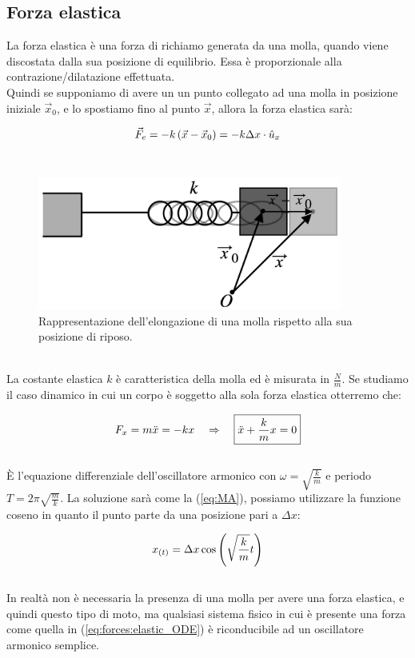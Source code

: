 \subsection{Forza elastica}
La forza elastica è una forza di richiamo generata da una molla, quando viene
discostata dalla sua posizione di equilibrio. Essa è proporzionale alla
contrazione/dilatazione effettuata.\\ Quindi se supponiamo di avere un un
punto collegato ad una molla in posizione iniziale $\vec x_0$, e lo spostiamo
fino al punto $\vec x$, allora la forza elastica sarà:

\begin{equation}
    \vec F_e = -k\left(\vec x-\vec x_0\right) = -k\Delta x\cdot\hat u_x
\end{equation}
\\
\begin{figure}[htbp]
    \begin{center}
        \includegraphics[width=10cm]{images/molla.png}
        \caption{Rappresentazione dell'elongazione di una molla rispetto
        alla sua posizione di riposo.}
\end{center}
\label{fig:forces:elastic}
\end{figure}
\\
La costante elastica $k$ è caratteristica della molla ed è misurata in
$\frac Nm$. Se studiamo il caso dinamico in cui un corpo è soggetto alla
sola forza elastica otterremo che:

\begin{equation}
    F_x = m\ddot x = -kx \quad\Rightarrow\quad \boxed{\ddot x +\frac km x = 0}
\label{eq:forces:elastic_ODE}
\end{equation}
\\
È l'equazione differenziale dell'oscillatore armonico con
$\omega = \sqrt{\frac km}$ e periodo $T =2\pi\sqrt{\frac mk}$.
La soluzione sarà come la (\ref{eq:MA}), possiamo utilizzare la funzione
coseno in quanto il punto parte da una posizione pari a $\Delta x$:

\begin{equation}
    x_{(t)} = \Delta x \cos\left( \sqrt{\frac km}t\right)
\label{eq:forces:elastic_x}
\end{equation}
\\
In realtà non è necessaria la presenza di una molla per avere una forza
elastica, e quindi questo tipo di moto, ma qualsiasi sistema fisico in cui è
presente una forza come quella in (\ref{eq:forces:elastic_ODE}) è
riconducibile ad un oscillatore armonico semplice.
